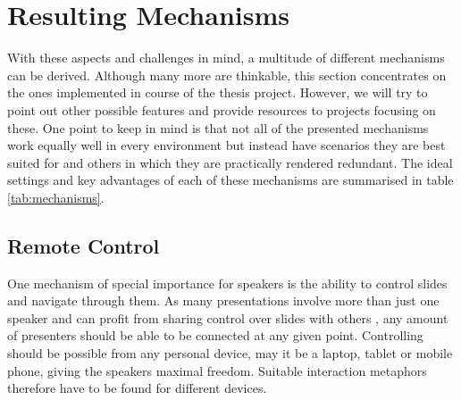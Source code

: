 \section{Resulting Mechanisms}
With these aspects and challenges in mind, a multitude of different mechanisms can be derived. Although many more are thinkable, this section concentrates on the ones implemented in course of the thesis project. However, we will try to point out other possible features and provide resources to projects focusing on these. One point to keep in mind is that not all of the presented mechanisms work equally well in every environment but instead have scenarios they are best suited for and others in which they are practically rendered redundant. The ideal settings and key advantages of each of these mechanisms are summarised in table \ref{tab:mechanisms}.

%

\subsection{Remote Control}
One mechanism of special importance for speakers is the ability to control slides and navigate through them. As many presentations involve more than just one speaker and can profit from sharing control over slides with others \cite{Chattopadhyay:OfficeSocialRemoteControl}, any amount of presenters should be able to be connected at any given point. Controlling should be possible from any personal device, may it be a laptop, tablet or mobile phone, giving the speakers maximal freedom. Suitable interaction metaphors therefore have to be found for different devices.

